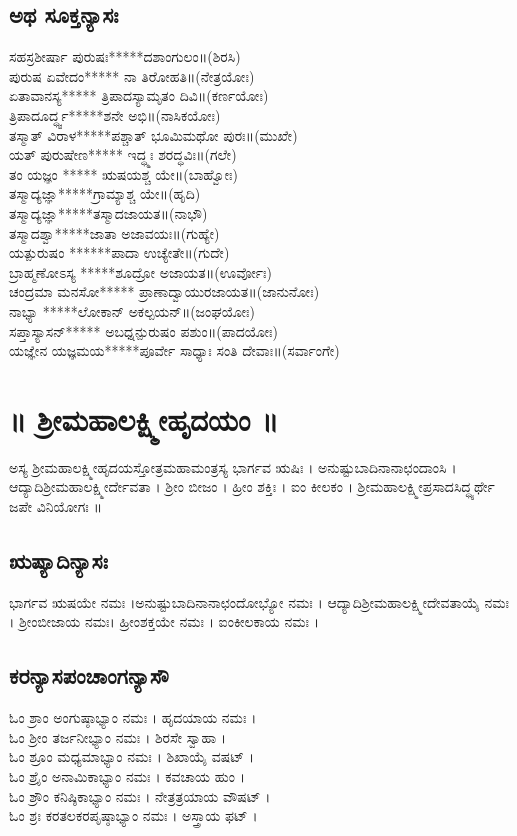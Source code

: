   \section{ಅಥ ಸೂಕ್ತನ್ಯಾಸಃ}
ಸಹಸ್ರಶೀರ್ಷಾ ಪುರುಷಃ*****ದಶಾಂಗುಲಂ॥(ಶಿರಸಿ)\\
ಪುರುಷ ಏವೇದಂ***** ನಾ ತಿರೋಹತಿ॥(ನೇತ್ರಯೋಃ)\\
ಏತಾವಾನಸ್ಯ***** ತ್ರಿಪಾದಸ್ಯಾಮೃತಂ ದಿವಿ॥(ಕರ್ಣಯೋಃ)\\
ತ್ರಿಪಾದೂರ್ದ್ಧ್ವ*****ಶನೇ ಅಭಿ॥(ನಾಸಿಕಯೋಃ)\\
ತಸ್ಮಾತ್ ವಿರಾಳ*****ಪಶ್ಚಾತ್ ಭೂಮಿಮಥೋ ಪುರಃ॥(ಮುಖೇ)\\
ಯತ್ ಪುರುಷೇಣ***** ಇದ್ಧ್ಮಃ ಶರದ್ಧವಿಃ॥(ಗಲೇ)\\
ತಂ ಯಜ್ಞಂ ***** ಋಷಯಶ್ಚ ಯೇ॥(ಬಾಹ್ವೋಃ)\\
ತಸ್ಮಾದ್ಯಜ್ಞಾ*****ಗ್ರಾಮ್ಯಾಶ್ಚ ಯೇ॥(ಹೃದಿ)\\
ತಸ್ಮಾದ್ಯಜ್ಞಾ*****ತಸ್ಮಾದಜಾಯತ॥(ನಾಭೌ)\\
ತಸ್ಮಾದಶ್ವಾ*****ಜಾತಾ ಅಜಾವಯಃ॥(ಗುಹ್ಯೇ)\\
ಯತ್ಪುರುಷಂ ******ಪಾದಾ ಉಚ್ಯೇತೇ॥(ಗುದೇ)\\
ಬ್ರಾಹ್ಮಣೋಽಸ್ಯ *****ಶೂದ್ರೋ ಅಜಾಯತ॥(ಊರ್ವೋಃ)\\
ಚಂದ್ರಮಾ ಮನಸೋ*****  ಪ್ರಾಣಾದ್ವಾಯುರಜಾಯತ॥(ಜಾನುನೋಃ)\\
ನಾಭ್ಯಾ *****ಲೋಕಾನ್ ಅಕಲ್ಪಯನ್॥(ಜಂಘಯೋಃ)\\
ಸಪ್ತಾಸ್ಯಾಸನ್***** ಅಬಧ್ನನ್ಪುರುಷಂ ಪಶುಂ॥(ಪಾದಯೋಃ)\\
ಯಜ್ಞೇನ ಯಜ್ಞಮಯ*****ಪೂರ್ವೇ ಸಾಧ್ಯಾಃ ಸಂತಿ ದೇವಾಃ॥(ಸರ್ವಾಂಗೇ)
\chapter*{\center ॥ ಶ್ರೀಮಹಾಲಕ್ಷ್ಮೀಹೃದಯಂ ॥}
ಅಸ್ಯ ಶ್ರೀಮಹಾಲಕ್ಷ್ಮೀಹೃದಯಸ್ತೋತ್ರಮಹಾಮಂತ್ರಸ್ಯ ಭಾರ್ಗವ ಋಷಿಃ । ಅನುಷ್ಟುಬಾದಿನಾನಾಛಂದಾಂಸಿ । ಆದ್ಯಾದಿಶ್ರೀಮಹಾಲಕ್ಷ್ಮೀರ್ದೇವತಾ । ಶ್ರೀಂ ಬೀಜಂ । ಹ್ರೀಂ ಶಕ್ತಿಃ । ಐಂ ಕೀಲಕಂ । ಶ್ರೀಮಹಾಲಕ್ಷ್ಮೀಪ್ರಸಾದಸಿದ್ಧ್ಯರ್ಥೇ ಜಪೇ ವಿನಿಯೋಗಃ ॥
\section{ಋಷ್ಯಾದಿನ್ಯಾಸಃ}
ಭಾರ್ಗವ ಋಷಯೇ ನಮಃ ।ಅನುಷ್ಟುಬಾದಿನಾನಾಛಂದೋಭ್ಯೋ ನಮಃ । ಆದ್ಯಾದಿಶ್ರೀಮಹಾಲಕ್ಷ್ಮೀದೇವತಾಯೈ ನಮಃ । ಶ್ರೀಂಬೀಜಾಯ ನಮಃ। ಹ್ರೀಂಶಕ್ತಯೇ ನಮಃ । ಐಂಕೀಲಕಾಯ ನಮಃ ।
\newpage
\section{ಕರನ್ಯಾಸಪಂಚಾಂಗನ್ಯಾಸೌ}
ಓಂ ಶ್ರಾಂ ಅಂಗುಷ್ಠಾಭ್ಯಾಂ ನಮಃ । ಹೃದಯಾಯ ನಮಃ ।\\
ಓಂ ಶ್ರೀಂ ತರ್ಜನೀಭ್ಯಾಂ ನಮಃ । ಶಿರಸೇ ಸ್ವಾಹಾ ।\\
ಓಂ ಶ್ರೂಂ ಮಧ್ಯಮಾಭ್ಯಾಂ ನಮಃ । ಶಿಖಾಯೈ ವಷಟ್ ।\\
ಓಂ ಶ್ರೈಂ ಅನಾಮಿಕಾಭ್ಯಾಂ ನಮಃ । ಕವಚಾಯ ಹುಂ ।\\
ಓಂ ಶ್ರೌಂ ಕನಿಷ್ಠಿಕಾಭ್ಯಾಂ ನಮಃ । ನೇತ್ರತ್ರಯಾಯ ವೌಷಟ್ ।\\
ಓಂ ಶ್ರಃ ಕರತಲಕರಪೃಷ್ಠಾಭ್ಯಾಂ ನಮಃ । ಅಸ್ತ್ರಾಯ ಫಟ್ ।

